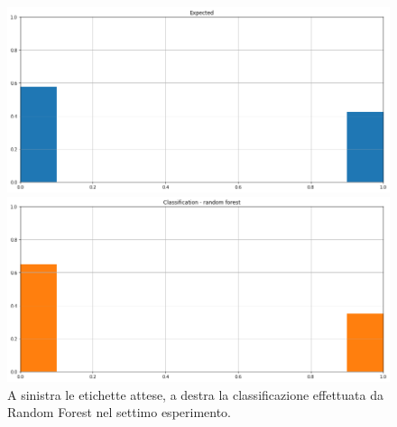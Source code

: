 \documentclass[12pt]{report}
\theoremstyle{definition}
\begin{document}
\begin{figure}
\centering
    \begin{minipage}{0.48\textwidth}
        \includegraphics[width=\linewidth]{images/experiment_kaggle/expected_classification.png}
    \end{minipage}
    \begin{minipage}{0.48\textwidth}
        \includegraphics[width=\linewidth]{images/experiment_kaggle/prediction_classification_rf.png}
    \end{minipage}
    \caption{A sinistra le etichette attese, a destra la classificazione effettuata da Random Forest nel settimo esperimento.}
    \label{rf_class_exp7}
\end{figure} 
\end{document}
